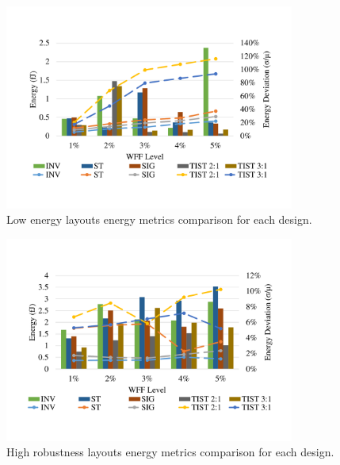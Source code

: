 \documentclass[pgmicro,diss,english]{iiufrgs}
\begin{document}
    \begin{figure}[t]
        \centering
            \includegraphics[width=0.85\textwidth, trim={1.25cm 3cm 2cm 3cm}, clip]{compLowEnergy.pdf}
            \caption{Low energy layouts energy metrics comparison for each design.}
        \label{figCompLowEnergy}
    \end{figure}

    \begin{figure}[h]
        \centering
            \includegraphics[width=0.85\textwidth, trim={1.25cm 3cm 2cm 3cm}, clip]{compHighRobustness.pdf}
            \caption{High robustness layouts energy metrics comparison for each design.}
        \label{figCompHighRobustness}
    \end{figure}
\end{document}
